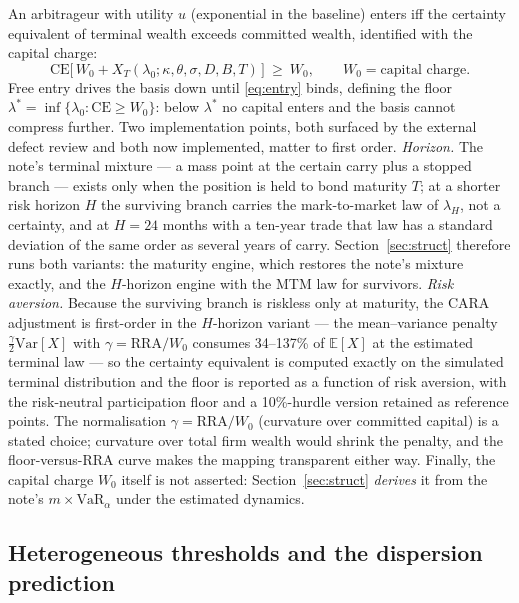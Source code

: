 \documentclass[11pt]{article}
\newcommand{\CE}{\mathrm{CE}}
\newcommand{\VaR}{\mathrm{VaR}}
\begin{document}
An arbitrageur with utility $u$ (exponential in the baseline) enters iff the certainty equivalent of terminal wealth exceeds committed wealth, identified with the capital charge:
\begin{equation}
\CE\big[\,W_0+X_T(\lambda_0;\kappa,\theta,\sigma,D,B,T)\,\big]\ \ge\ W_0,\qquad W_0=\text{capital charge}.
\label{eq:entry}
\end{equation}
Free entry drives the basis down until \eqref{eq:entry} binds, defining the floor $\lambda^*=\inf\{\lambda_0:\CE\ge W_0\}$: below $\lambda^*$ no capital enters and the basis cannot compress further. Two implementation points, both surfaced by the external defect review and both now implemented, matter to first order. \emph{Horizon.} The note's terminal mixture --- a mass point at the certain carry plus a stopped branch --- exists only when the position is held to bond maturity $T$; at a shorter risk horizon $H$ the surviving branch carries the mark-to-market law of $\lambda_H$, not a certainty, and at $H=24$ months with a ten-year trade that law has a standard deviation of the same order as several years of carry. Section~\ref{sec:struct} therefore runs both variants: the maturity engine, which restores the note's mixture exactly, and the $H$-horizon engine with the MTM law for survivors. \emph{Risk aversion.} Because the surviving branch is riskless only at maturity, the CARA adjustment is first-order in the $H$-horizon variant --- the mean--variance penalty $\tfrac{\gamma}{2}\mathrm{Var}[X]$ with $\gamma=\text{RRA}/W_0$ consumes 34--137\% of $\mathbb{E}[X]$ at the estimated terminal law --- so the certainty equivalent is computed exactly on the simulated terminal distribution and the floor is reported as a function of risk aversion, with the risk-neutral participation floor and a 10\%-hurdle version retained as reference points. The normalisation $\gamma=\text{RRA}/W_0$ (curvature over committed capital) is a stated choice; curvature over total firm wealth would shrink the penalty, and the floor-versus-RRA curve makes the mapping transparent either way. Finally, the capital charge $W_0$ itself is not asserted: Section~\ref{sec:struct} \emph{derives} it from the note's $m\times\VaR_\alpha$ under the estimated dynamics.

\subsection{Heterogeneous thresholds and the dispersion prediction}
\end{document}
